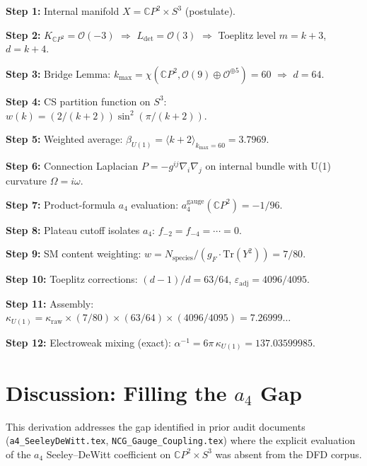 \documentclass[12pt,a4paper]{article}
\begin{document}
\begin{tcolorbox}[colback=yellow!5!white, colframe=orange!50!black,
  title=Complete Chain: First Principles $\to$ $\alpha^{-1} = 137.036$]

\textbf{Step 1:} Internal manifold $X = \mathbb{C}P^2 \times S^3$
(postulate).

\textbf{Step 2:} $K_{\mathbb{C}P^2} = \mathcal{O}(-3)$ $\Rightarrow$
$L_{\det} = \mathcal{O}(3)$ $\Rightarrow$ Toeplitz level $m = k + 3$,
$d = k + 4$.

\textbf{Step 3:} Bridge Lemma: $k_{\max} = \chi(\mathbb{C}P^2,
\mathcal{O}(9) \oplus \mathcal{O}^{\oplus 5}) = 60$
$\Rightarrow$ $d = 64$.

\textbf{Step 4:} CS partition function on $S^3$:
$w(k) = (2/(k{+}2))\sin^2(\pi/(k{+}2))$.

\textbf{Step 5:} Weighted average:
$\beta_{U(1)} = \langle k + 2 \rangle_{k_{\max}=60} = 3.7969$.

\textbf{Step 6:} Connection Laplacian $P = -g^{ij}\nabla_i\nabla_j$
on internal bundle with U(1) curvature $\Omega = i\omega$.

\textbf{Step 7:} Product-formula $a_4$ evaluation:
$a_4^{\mathrm{gauge}}(\mathbb{C}P^2) = -1/96$.

\textbf{Step 8:} Plateau cutoff isolates $a_4$:
$f_{-2} = f_{-4} = \cdots = 0$.

\textbf{Step 9:} SM content weighting:
$w = N_{\mathrm{species}}/(g_F \cdot \mathrm{Tr}(Y^2)) = 7/80$.

\textbf{Step 10:} Toeplitz corrections:
$(d{-}1)/d = 63/64$, $\varepsilon_{\mathrm{adj}} = 4096/4095$.

\textbf{Step 11:} Assembly:
$\kappa_{U(1)} = \kappa_{\mathrm{raw}} \times (7/80) \times (63/64) \times (4096/4095)
= 7.26999\ldots$

\textbf{Step 12:} Electroweak mixing (exact):
$\alpha^{-1} = 6\pi\,\kappa_{U(1)} = 137.03599985$.
\end{tcolorbox}

\section{Discussion: Filling the $a_4$ Gap}
\label{sec:discussion}

This derivation addresses the gap identified in prior audit documents
(\texttt{a4\_SeeleyDeWitt.tex}, \texttt{NCG\_Gauge\_Coupling.tex}) where
the explicit evaluation of the $a_4$ Seeley--DeWitt coefficient on
$\mathbb{C}P^2 \times S^3$ was absent from the DFD corpus.
\end{document}
